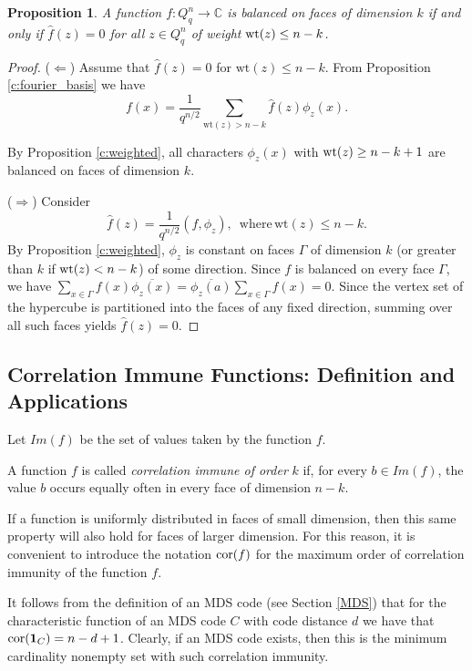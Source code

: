 \documentclass[11pt]{article}
\newtheorem{claim}{Proposition}[section]
\theoremstyle{definition}
\newcommand{\wt}{{\rm wt}}
\newcommand{\cor}{{\rm cor}}
\begin{document}
{{{\begin{claim}\label{c:weighted1}
  A function $f: Q_q^n\rightarrow \mathbb{C}$ is balanced on faces of dimension
    $k$ if and only if
      $\widehat{f}(z)=0$ for all $z\in Q_q^n$ of weight $\wt(z)\le n-k$.
\end{claim}

\begin{proof}
 ($\Leftarrow$)     Assume that $\widehat{f}(z)=0$ for $\mathrm{wt}(z)\le n-k$.
    From Proposition \ref{c:fourier_basis} we have
    \[
    f(x)=\frac{1}{q^{n/2}}\sum\limits_{\mathrm{wt}(z)>n-k}\widehat{f}(z)\phi_z(x).
    \]

  By Proposition \ref{c:weighted}, all characters $\phi_z(x)$
  with $\wt(z)\ge n-k+1$ are balanced on faces of dimension $k$.

 ($\Rightarrow$)   Consider
    \[
    \widehat{f}(z)=\frac{1}{q^{n/2}}(f,\phi_z),\, \mbox{ where}\,
    \mathrm{wt}(z)\le n-k.
    \]
    By Proposition \ref{c:weighted}, $\phi_z$ is constant
    on faces $\Gamma$ of dimension $k$ (or greater than $k$ if $\wt(z)<n-k$) of some direction.
    Since $f$ is balanced on every face $\Gamma$, we have $\sum\limits_{x\in \Gamma} f(x)\overline{\phi_z(x)}=
    \overline{\phi_z(a)}\sum\limits_{x\in \Gamma} f(x)=0$. Since the vertex set of the hypercube is partitioned into the faces of any fixed direction, summing over all such faces yields
     $\widehat{f}(z)=0$.
\end{proof}

\subsection{Correlation Immune Functions: Definition and Applications}

Let $Im(f)$ be the set of values taken by the function $f$.

    A function $f$ is called {\sl correlation immune
    of order} $k$ if, for every $b\in Im(f)$,  the value $b$ occurs equally often 
     in every face of dimension $n-k$.

If a function is uniformly distributed in faces of small
dimension, then this same property will also hold for faces of
larger dimension. For this reason, it is convenient to introduce the notation
$\cor(f)$ for the maximum order of correlation immunity
of the function $f$.

It follows from the definition of an MDS code (see Section \ref{MDS}) that for the characteristic function of an MDS code $C$ with code
distance $d$ we have that $\cor({\mathbf 1}_{C})=n-d+1$.  Clearly, if an MDS code exists, then this is the
minimum cardinality nonempty set with such correlation immunity.

}}}
\end{document}
